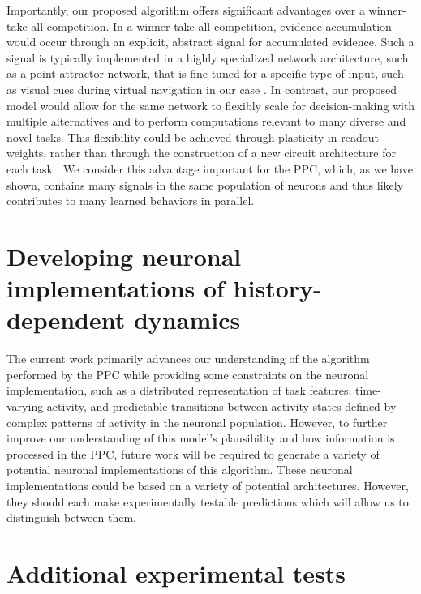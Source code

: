 \bigskip
Importantly, our proposed algorithm offers significant advantages over a winner-take-all competition. In a winner-take-all competition, evidence accumulation would occur through an explicit, abstract signal for accumulated evidence. Such a signal is typically implemented in a highly specialized network architecture, such as a point attractor network, that is fine tuned for a specific type of input, such as visual cues during virtual navigation in our case \citep{Wong:2006in, Machens:2005en, Wang:2002kn}. In contrast, our proposed model would allow for the same network to flexibly scale for decision-making with multiple alternatives and to perform computations relevant to many diverse and novel tasks. This flexibility could be achieved through plasticity in readout weights, rather than through the construction of a new circuit architecture for each task \citep{Legenstein:2008gx, Gutig:2006cz, Jaeger:2004hj, Sussillo:2009gh, Barak:2013bg, Sussillo:2014dy, Rosenblatt:1958vca, Hoerzer:2014cz, Mante:2013ie}. We consider this advantage important for the PPC, which, as we have shown, contains many signals in the same population of neurons and thus likely contributes to many learned behaviors in parallel.

\section{Developing neuronal implementations of history-dependent dynamics} \label{discussion:neural_implementation}

The current work primarily advances our understanding of the algorithm performed by the PPC while providing some constraints on the neuronal implementation, such as a distributed representation of task features, time-varying activity, and predictable transitions between activity states defined by complex patterns of activity in the neuronal population. However, to further improve our understanding of this model's plausibility and how information is processed in the PPC, future work will be required to generate a variety of potential neuronal implementations of this algorithm. These neuronal implementations could be based on a variety of potential architectures. However, they should each make experimentally  testable predictions which will allow us to distinguish between them.  

\section{Additional experimental tests} \label{discussion:additional_tests}

